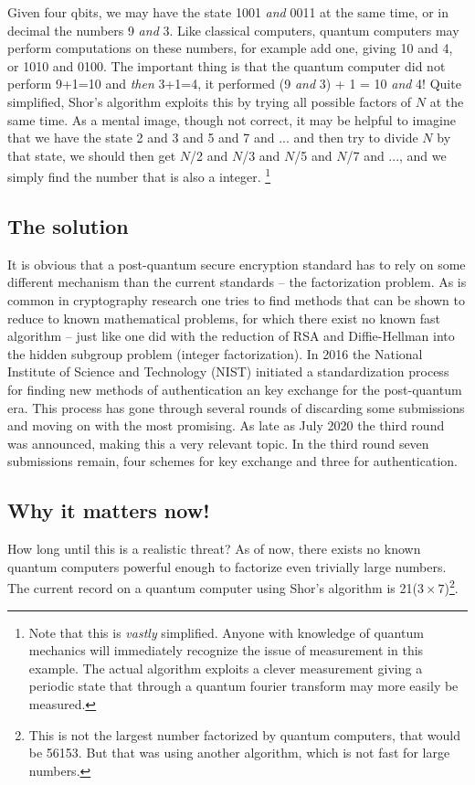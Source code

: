 \documentclass[conference]{IEEEtran}
\begin{document}
Given four qbits, we may have the state 1001 \emph{and} 0011 at the same time, or in decimal the numbers 9 \emph{and} 3.
Like classical computers, quantum computers may perform computations on these numbers, for example add one, giving 10 and 4, or 1010 and 0100.
The important thing is that the quantum computer did not perform 9+1=10 and \emph{then} 3+1=4, it performed (9 \emph{and} 3) + 1 = 10 \emph{and} 4!
Quite simplified, Shor's algorithm exploits this by trying all possible factors of $N$ at the same time.
As a mental image, though not correct, it may be helpful to imagine that we have the state 2 and 3 and 5 and 7 and ... and then try to divide $N$ by that state, we should then get $N$/2 and $N$/3 and $N$/5 and $N$/7 and ..., and we simply find the number that is also a integer. \footnote{Note that this is \emph{vastly} simplified. Anyone with knowledge of quantum mechanics will immediately recognize the issue of measurement in this example. The actual algorithm exploits a clever measurement giving a periodic state that through a quantum fourier transform may more easily be measured.}


\subsection{The solution}
It is obvious that a post-quantum secure encryption standard has to rely on some different mechanism than the current standards -- the factorization problem.
As is common in cryptography research one tries to find methods that can be shown to reduce to known mathematical problems, for which there exist no known fast algorithm -- just like one did with the reduction of RSA and Diffie-Hellman into the hidden subgroup problem (integer factorization).
In 2016 the National Institute of Science and Technology (NIST) initiated a standardization process for finding new methods of authentication an key exchange for the post-quantum era.
This process has gone through several rounds of discarding some submissions and moving on with the most promising.
As late as July 2020 the third round was announced, making this a very relevant topic.
In the third round seven submissions remain, four schemes for key exchange and three for authentication.


\subsection{Why it matters now!}
How long until this is a realistic threat?
As of now, there exists no known quantum computers powerful enough to factorize even trivially large numbers.
The current record on a quantum computer using Shor's algorithm is 21($3\times7$)\footnote{This is not the largest number factorized by quantum computers, that would be 56153. But that was using another algorithm, which is not fast for large numbers.}\cite{shor21}.
\end{document}
